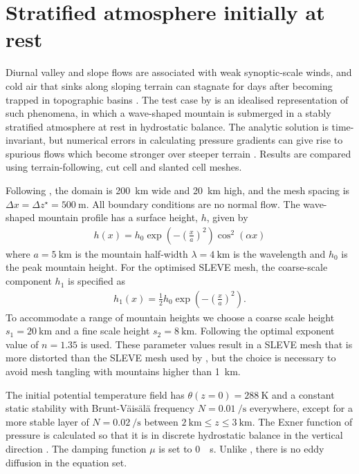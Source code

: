 \section{Stratified atmosphere initially at rest}
\label{sec:slanted:resting}

Diurnal valley and slope flows are associated with weak synoptic-scale winds, and cold air that sinks along sloping terrain can stagnate for days after becoming trapped in topographic basins \citep{chow2013}.
The test case by \citet{klemp2011} is an idealised representation of such phenomena, in which a wave-shaped mountain is submerged in a stably stratified atmosphere at rest in hydrostatic balance.  The analytic solution is time-invariant, but numerical errors in calculating pressure gradients can give rise to spurious flows which become stronger over steeper terrain \citep{klemp2011}.  Results are compared using terrain-following, cut cell and slanted cell meshes.

Following \cite{klemp2011}, the domain is \SI{200}{\kilo\meter} wide and \SI{20}{\kilo\meter} high, and the mesh spacing is \(\Delta x = \Delta z^\star = \SI{500}{\meter}\).  All boundary conditions are no normal flow.
The wave-shaped mountain profile has a surface height, $h$, given by
\begin{align}
	h(x) = h_0 \exp \left( - \left( \frac{x}{a} \right)^2 \right) \cos^2 \left( \alpha x \right) \label{eqn:resting:mountain}
\end{align}
where $a = \SI{5}{\kilo\meter}$ is the mountain half-width $\lambda = \SI{4}{\kilo\meter}$ is the wavelength and $h_0$ is the peak mountain height.  For the optimised SLEVE mesh, the coarse-scale component $h_1$ is specified as
\begin{align}
	h_1(x) = \frac{1}{2} h_0 \exp \left( - \left( \frac{x}{a} \right)^2 \right) \text{.}
\end{align}
To accommodate a range of mountain heights we choose a coarse scale height $s_1 = \SI{20}{\kilo\meter}$ and a fine scale height $s_2 = \SI{8}{\kilo\meter}$.  Following \citet{leuenberger2010} the optimal exponent value of $n = \num{1.35}$ is used.  These parameter values result in a SLEVE mesh that is more distorted than the SLEVE mesh used by \citet{klemp2011}, but the choice is necessary to avoid mesh tangling with mountains higher than \SI{1}{\kilo\meter}.

The initial potential temperature field has $\theta(z = 0) = \SI{288}{\kelvin}$ and a constant static stability with Brunt-V\"ais\"al\"a frequency $N = \SI{0.01}{\per\second}$ everywhere, except for a more stable layer of $N = \SI{0.02}{\per\second}$ between $\SI{2}{\kilo\meter} \leq z \leq \SI{3}{\kilo\meter}$.  The Exner function of pressure is calculated so that it is in discrete hydrostatic balance in the vertical direction \citep{weller-shahrokhi2014}.  The damping function \(\mu\) is set to \SI{0}{\per\second}.  Unlike \citet{klemp2011}, there is no eddy diffusion in the equation set.

